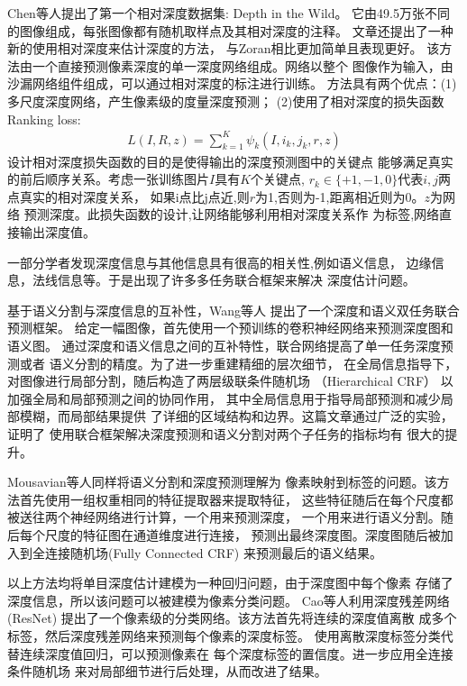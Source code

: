 Chen等人\cite{chen2016}提出了第一个相对深度数据集: Depth in the Wild。
它由49.5万张不同的图像组成，每张图像都有随机取样点及其相对深度的注释。
文章还提出了一种新的使用相对深度来估计深度的方法，
与Zoran\cite{zoran2015learning}相比更加简单且表现更好。
该方法由一个直接预测像素深度的单一深度网络组成。网络以整个
图像作为输入，由沙漏网络组件组成，可以通过相对深度的标注进行训练。
方法具有两个优点：(1)多尺度深度网络，产生像素级的度量深度预测；
(2)使用了相对深度的损失函数Ranking loss:
\begin{align}
    L(I,R,z) = \sum\limits_{k=1}^{K} \psi_k (I,i_k,j_k,r,z)
\end{align}
设计相对深度损失函数的目的是使得输出的深度预测图中的关键点
能够满足真实
的前后顺序关系。考虑一张训练图片$I$具有$K$个关键点,
$r_k \in \{+1,-1,0\}$代表$i,j$两点真实的相对深度关系，
如果i点比j点近,则$r$为1,否则为-1,距离相近则为0。$z$为网络
预测深度。此损失函数的设计,让网络能够利用相对深度关系作
为标签,网络直接输出深度值。

一部分学者发现深度信息与其他信息具有很高的相关性,例如语义信息，
边缘信息，法线信息等。于是出现了许多多任务联合框架来解决
深度估计问题。

基于语义分割与深度信息的互补性，Wang等人\cite{2015semantic}
提出了一个深度和语义双任务联合预测框架。
给定一幅图像，首先使用一个预训练的卷积神经网络来预测深度图和语义图。
通过深度和语义信息之间的互补特性，联合网络提高了单一任务深度预测或者
语义分割的精度。为了进一步重建精细的层次细节，
在全局信息指导下，对图像进行局部分割，随后构造了两层级联条件随机场
（Hierarchical CRF）
以加强全局和局部预测之间的协同作用，
其中全局信息用于指导局部预测和减少局部模糊，而局部结果提供
了详细的区域结构和边界。这篇文章通过广泛的实验，证明了
使用联合框架解决深度预测和语义分割对两个子任务的指标均有
很大的提升。

Mousavian等人\cite{2016semantic}同样将语义分割和深度预测理解为
像素映射到标签的问题。该方法首先使用一组权重相同的特征提取器来提取特征，
这些特征随后在每个尺度都被送往两个神经网络进行计算，一个用来预测深度，
一个用来进行语义分割。随后每个尺度的特征图在通道维度进行连接，
预测出最终深度图。深度图随后被加入到全连接随机场(Fully Connected CRF)
来预测最后的语义结果。

以上方法均将单目深度估计建模为一种回归问题，由于深度图中每个像素
存储了深度信息，所以该问题可以被建模为像素分类问题。
Cao等人\cite{cao2017estimating}利用深度残差网络 (ResNet)
提出了一个像素级的分类网络。该方法首先将连续的深度值离散
成多个标签，然后深度残差网络来预测每个像素的深度标签。
使用离散深度标签分类代替连续深度值回归，可以预测像素在
每个深度标签的置信度。进一步应用全连接条件随机场
来对局部细节进行后处理，从而改进了结果。
